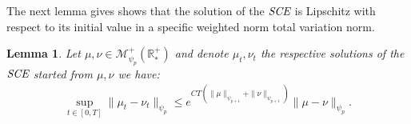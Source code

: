 \documentclass[11pt,a4paper]{article}
\newcommand{\RRP}{\mathbb{R}^+_*}
\newcommand{\MC}{\mathcal{M}}
\newcommand{\SCE}{\emph{SCE}}
\newcommand{\brac}[1]{\left\langle#1\right\rangle}
\newcommand{\dd}{\mathop{}\!\mathrm{d}}
\newtheorem{lemma}[theorem]{Lemma}
\begin{document}
The next lemma gives shows that the solution of the $\SCE$ is Lipschitz with respect to its initial value in a specific weighted norm total variation norm.
\begin{lemma}\label{lem:Lip-smol-TV}
    Let $\mu,\nu \in \MC^+_{\psi_p}(\RRP)$ and denote $\mu_t,\nu_t$ the respective solutions of the $\SCE$ started from $\mu,\nu$ we have:
    \begin{align*}
        \sup\limits_{t \in [0,T]}\| \mu_t - \nu_t\|_{\psi_p} \leq e^{CT\left(\|\mu\|_{\psi_{p+1}} + \|\nu\|_{\psi_{p+1}}\right)}\|\mu- \nu\|_{\psi_p}.
    \end{align*}
\end{lemma}
\end{document}
